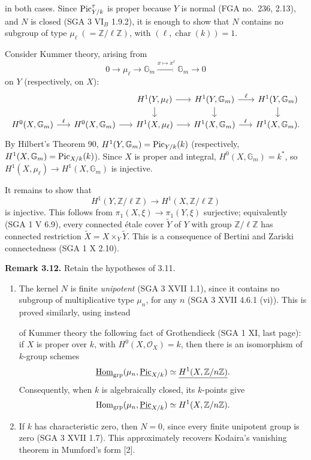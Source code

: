 in both cases. Since \(\operatorname{Pic}^\tau_{Y/k}\) is proper because \(Y\) is
normal (FGA no.~236, 2.13), and \(N\) is closed (SGA 3 VI\(_B\) 1.9.2),
it is enough to show that \(N\) contains no subgroup of type
\(\mu_\ell\;(=\mathbb Z/\ell\mathbb Z)\), with
\((\ell,\operatorname{char}(k))=1\).

Consider Kummer theory, arising from
\[
0\longrightarrow\mu_\ell\longrightarrow\mathbb G_m
\xrightarrow{x\mapsto x^\ell}\mathbb G_m\longrightarrow0
\]
on \(Y\) (respectively, on \(X\)):
\[
\begin{tikzcd}[column sep=1.6em,row sep=1.2em]
&&H^1(Y,\mu_\ell)\arrow[r]\arrow[d]&
H^1(Y,\mathbb G_m)\arrow[r,"\ell"]\arrow[d]&
H^1(Y,\mathbb G_m)\arrow[d]\\
H^0(X,\mathbb G_m)\arrow[r,"\ell"]&
H^0(X,\mathbb G_m)\arrow[r]&
H^1(X,\mu_\ell)\arrow[r]&
H^1(X,\mathbb G_m)\arrow[r,"\ell"]&
H^1(X,\mathbb G_m).
\end{tikzcd}
\]
By Hilbert's Theorem 90, \(H^1(Y,\mathbb G_m)=\operatorname{Pic}_{Y/k}(k)\)
(respectively, \(H^1(X,\mathbb G_m)=\operatorname{Pic}_{X/k}(k)\)). Since \(X\) is
proper and integral, \(H^0(X,\mathbb G_m)=k^*\), so
\(H^1(X,\mu_\ell)\to H^1(X,\mathbb G_m)\) is injective.

It remains to show that
\[
H^1(Y,\mathbb Z/\ell\mathbb Z)\longrightarrow
H^1(X,\mathbb Z/\ell\mathbb Z)
\]
is injective. This follows from \(\pi_1(X,\xi)\to\pi_1(Y,\xi)\)
surjective; equivalently (SGA 1 V 6.9), every connected \'etale cover
\(\widetilde Y\) of \(Y\) with group \(\mathbb Z/\ell\mathbb Z\) has
connected restriction \(\widetilde X=X\times_Y\widetilde Y\). This is a
consequence of Bertini and Zariski connectedness (SGA 1 X 2.10).

\textbf{Remark 3.12.} Retain the hypotheses of 3.11.
\begin{enumerate}[label=(\roman*)]
\item The kernel \(N\) is finite \emph{unipotent} (SGA 3 XVII 1.1),
since it contains no subgroup of multiplicative type \(\mu_n\), for any
\(n\) (SGA 3 XVII 4.6.1 (vi)). This is proved similarly, using instead

of Kummer theory the following fact of Grothendieck (SGA 1 XI, last
page): if \(X\) is proper over \(k\), with \(H^0(X,\mathcal O_X)=k\),
then there is an isomorphism of \(k\)-group schemes
\[
\underline{\operatorname{Hom}}_{\mathrm{grp}}
(\mu_n,\underline{\operatorname{Pic}}_{X/k})
\simeq \underline{H^1(X,\mathbb Z/n\mathbb Z)}.
\]
Consequently, when \(k\) is algebraically closed, its \(k\)-points give
\[
\operatorname{Hom}_{\mathrm{grp}}(\mu_n,\underline{\operatorname{Pic}}_{X/k})
\simeq H^1(X,\mathbb Z/n\mathbb Z).
\]
\item If \(k\) has characteristic zero, then \(N=0\), since every finite
unipotent group is zero (SGA 3 XVII 1.7). This approximately recovers
Kodaira's vanishing theorem in Mumford's form [2].
\end{enumerate}

